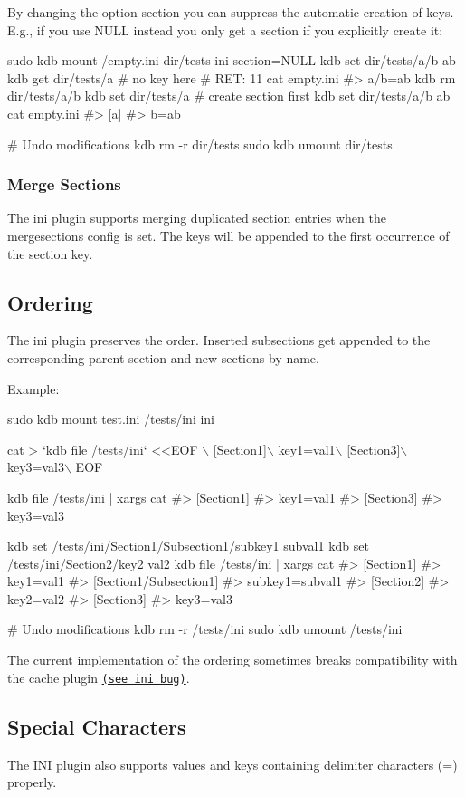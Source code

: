 By changing the option {\ttfamily section} you can suppress the automatic creation of keys. E.\+g., if you use {\ttfamily N\+U\+LL} instead you only get a section if you explicitly create it\+:


\begin{DoxyCode}
sudo kdb mount /empty.ini dir/tests ini section=NULL
kdb set dir/tests/a/b ab
kdb get dir/tests/a       # no key here
# RET: 11
cat empty.ini
#> a/b=ab
kdb rm dir/tests/a/b
kdb set dir/tests/a    # create section first
kdb set dir/tests/a/b ab
cat empty.ini
#> [a]
#> b=ab

# Undo modifications
kdb rm -r dir/tests
sudo kdb umount dir/tests
\end{DoxyCode}
\hypertarget{autotoc_md289_autotoc_md314}{}\subsubsection{Merge Sections}\label{autotoc_md289_autotoc_md314}
The ini plugin supports merging duplicated section entries when the {\ttfamily mergesections} config is set. The keys will be appended to the first occurrence of the section key.\hypertarget{autotoc_md289_autotoc_md315}{}\subsection{Ordering}\label{autotoc_md289_autotoc_md315}
The ini plugin preserves the order. Inserted subsections get appended to the corresponding parent section and new sections by name.

Example\+:


\begin{DoxyCode}
sudo kdb mount test.ini /tests/ini ini

cat > `kdb file /tests/ini` <<EOF \(\backslash\)
[Section1]\(\backslash\)
key1=val1\(\backslash\)
[Section3]\(\backslash\)
key3=val3\(\backslash\)
EOF

kdb file /tests/ini | xargs cat
#> [Section1]
#> key1=val1
#> [Section3]
#> key3=val3

kdb set /tests/ini/Section1/Subsection1/subkey1 subval1
kdb set /tests/ini/Section2/key2 val2
kdb file /tests/ini | xargs cat
#> [Section1]
#> key1=val1
#> [Section1/Subsection1]
#> subkey1=subval1
#> [Section2]
#> key2=val2
#> [Section3]
#> key3=val3

# Undo modifications
kdb rm -r /tests/ini
sudo kdb umount /tests/ini
\end{DoxyCode}


The current implementation of the ordering sometimes breaks compatibility with the cache plugin \href{https://github.com/ElektraInitiative/libelektra/issues/2592}{\tt (see ini bug)}.\hypertarget{autotoc_md289_autotoc_md316}{}\subsection{Special Characters}\label{autotoc_md289_autotoc_md316}
The I\+NI plugin also supports values and keys containing delimiter characters ({\ttfamily =}) properly.

